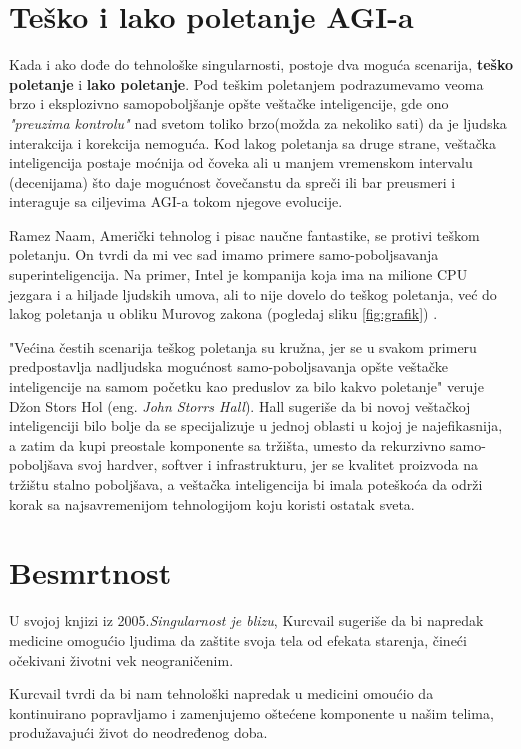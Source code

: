 \documentclass[a4paper]{article}
\begin{document}
\section{Teško i lako poletanje AGI-a}
\label{sec:poletanje}
Kada i ako dođe do tehnološke singularnosti, postoje dva moguća scenarija, \textbf{teško poletanje} i \textbf {lako poletanje}.
Pod teškim poletanjem podrazumevamo veoma brzo i eksplozivno samopoboljšanje opšte veštačke inteligencije, gde ono \textit{"preuzima kontrolu"} nad svetom toliko brzo(možda za nekoliko sati) da je ljudska interakcija i korekcija nemoguća. Kod lakog poletanja sa druge strane, veštačka inteligencija postaje moćnija od čoveka ali u manjem vremenskom intervalu (decenijama) što daje mogućnost čovečanstu da spreči ili bar preusmeri i interaguje sa ciljevima AGI-a tokom njegove evolucije.\cite{refe1}

Ramez Naam, Američki tehnolog i pisac naučne fantastike, se protivi teškom poletanju. On tvrdi da mi vec sad imamo primere samo-poboljsavanja superinteligencija. Na primer, Intel je kompanija koja ima na milione CPU jezgara i a hiljade ljudskih umova, ali to nije dovelo do teškog poletanja, već do lakog poletanja u obliku Murovog zakona (pogledaj sliku \ref{fig:grafik}) \cite{refe2}.

"Većina čestih scenarija teškog poletanja su kružna, jer se u svakom 
primeru predpostavlja nadljudska mogućnost samo-poboljsavanja opšte veštačke inteligencije na samom početku kao preduslov za bilo kakvo poletanje" veruje Džon Stors Hol (eng. \textit{John Storrs Hall}). Hall sugeriše da bi novoj veštačkoj inteligenciji bilo bolje da se specijalizuje u jednoj oblasti u kojoj je najefikasnija, a zatim da kupi preostale komponente sa tržišta, umesto da rekurzivno samo-poboljšava svoj hardver, softver i infrastrukturu, jer se kvalitet proizvoda na tržištu stalno poboljšava, a veštačka inteligencija bi imala poteškoća da održi korak sa najsavremenijom tehnologijom koju koristi ostatak sveta.\cite{refe3}

\section{Besmrtnost}
\label{sec:besmrtnost}
  U svojoj knjizi iz 2005.\textit {Singularnost je blizu}, Kurcvail sugeriše da bi napredak medicine omogućio ljudima da zaštite svoja tela od efekata starenja, čineći očekivani životni vek neograničenim. 
  
  Kurcvail tvrdi da bi nam tehnološki napredak u medicini omoućio da kontinuirano popravljamo i zamenjujemo oštećene komponente u našim telima, produžavajući život do neodređenog doba.
\end{document}
